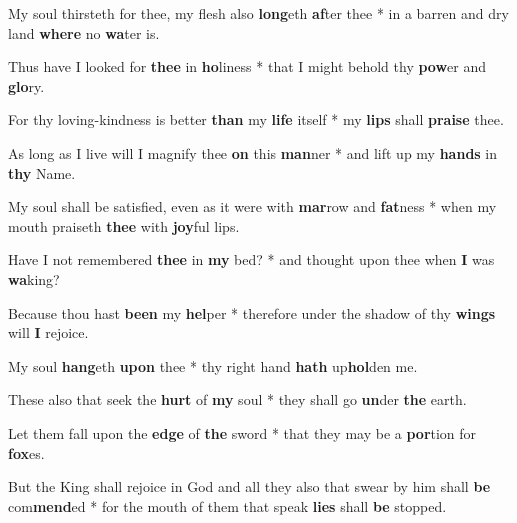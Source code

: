 \begin{multicols}{2}
	My soul thirsteth for thee, my flesh also \textbf{long}eth \textbf{af}ter thee * in a barren and dry land \textbf{where} no \textbf{wa}ter is.
	
	Thus have I looked for \textbf{thee} in \textbf{ho}liness * that I might behold thy \textbf{pow}er and \textbf{glo}ry.
	
	For thy loving-kindness is better \textbf{than} my \textbf{life} itself * my \textbf{lips} shall \textbf{praise} thee.
	
	As long as I live will I magnify thee \textbf{on} this \textbf{man}ner * and lift up my \textbf{hands} in \textbf{thy} Name.
	
	My soul shall be satisfied, even as it were with \textbf{mar}row and \textbf{fat}ness * when my mouth praiseth \textbf{thee} with \textbf{joy}ful lips.
	
	Have I not remembered \textbf{thee} in \textbf{my} bed? * and thought upon thee when \textbf{I} was \textbf{wa}king?
	
	Because thou hast \textbf{been} my \textbf{hel}per * therefore under the shadow of thy \textbf{wings} will \textbf{I} rejoice.
	
	My soul \textbf{hang}eth \textbf{upon} thee * thy right hand \textbf{hath} up\textbf{hol}den me.
	
	These also that seek the \textbf{hurt} of \textbf{my} soul * they shall go \textbf{un}der \textbf{the} earth.
	
	Let them fall upon the \textbf{edge} of \textbf{the} sword * that they may be a \textbf{por}tion for \textbf{fox}es.
	
	But the King shall rejoice in God and all they also that swear by him shall \textbf{be} com\textbf{mend}ed * for the mouth of them that speak \textbf{lies} shall \textbf{be} stopped.
\end{multicols}